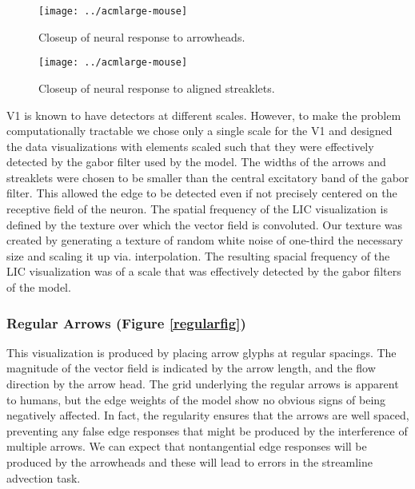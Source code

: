 \documentclass[prodmode,hillsideplop]{../acmlarge}
\begin{document}
\begin{figure}[tp]
    \begin{minipage}[t]{0.45\linewidth}
        \centering
        \texttt{[image: ../acmlarge-mouse]}
        \caption{Closeup of neural response to arrowheads.}
        \label{ortharrowheadfig}
    \end{minipage}
    \hspace{0.1\linewidth}
    \begin{minipage}[t]{0.45\linewidth}
        \centering
        \texttt{[image: ../acmlarge-mouse]}
        \caption{Closeup of neural response to aligned streaklets.}
        \label{alignedcloseupfig}
    \end{minipage}
\end{figure}


V1 is known to have detectors at different scales. However, to make
the problem computationally tractable we chose only a single scale
for the V1 and designed the data visualizations with elements scaled
such that they were effectively detected by the gabor filter used by
the model. The widths of the arrows and streaklets were chosen to be
smaller than the central excitatory band of the gabor filter. This
allowed the edge to be detected even if not precisely centered on the
receptive field of the neuron. The spatial frequency of the LIC
visualization is defined by the texture over which the vector field
is convoluted. Our texture was created by generating a texture of
random white noise of one-third the necessary size and scaling it up
via. interpolation. The resulting spacial frequency of the LIC
visualization was of a scale that was effectively detected by the
gabor filters of the model.

\subsubsection{Regular Arrows (Figure \ref{regularfig})} This
visualization is produced by placing arrow glyphs at regular
spacings. The magnitude of the vector field is indicated by the arrow
length, and the flow direction by the arrow head. The grid underlying
the regular arrows is apparent to humans, but the edge weights of the
model show no obvious signs of being negatively affected. In fact,
the regularity ensures that the arrows are well spaced, preventing
any false edge responses that might be produced by the interference
of multiple arrows. We can expect that nontangential edge responses
will be produced by the arrowheads and these will lead to errors in
the streamline advection task.
\end{document}
